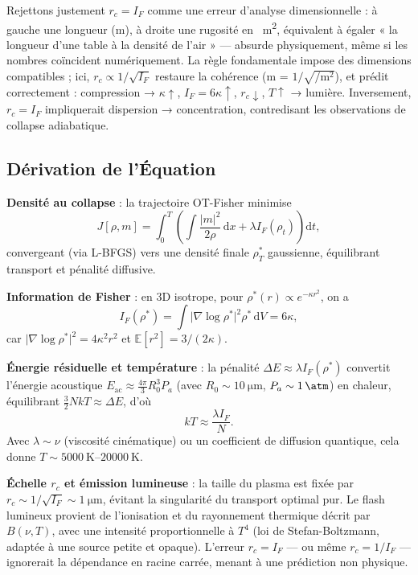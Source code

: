 \documentclass[a4paper,12pt]{article}
\begin{document}
Rejettons justement \( r_c = I_F \) comme une erreur d'analyse dimensionnelle : à gauche une longueur (\si{\meter}), à droite une rugosité en \si{\per\meter\squared}, équivalent à égaler « la longueur d'une table à la densité de l'air » — absurde physiquement, même si les nombres coïncident numériquement. La règle fondamentale impose des dimensions compatibles ; ici, \( r_c \propto 1/\sqrt{I_F} \) restaure la cohérence (\si{\meter} = \( 1/\sqrt{\si{\per\meter\squared}} \)), et prédit correctement : compression → \( \kappa \uparrow \), \( I_F = 6 \kappa \uparrow \), \( r_c \downarrow \), \( T \uparrow \) → lumière. Inversement, \( r_c = I_F \) impliquerait dispersion → concentration, contredisant les observations de collapse adiabatique.

\subsection{Dérivation de l'Équation}

\item \textbf{Densité au collapse} : la trajectoire OT-Fisher minimise 
    \[
    J[\rho, m] = \int_0^T \left( \int \frac{\lvert m \rvert^2}{2 \rho} \, \mathrm{d}x + \lambda I_F(\rho_t) \right) \mathrm{d}t,
    \]
    convergeant (via L-BFGS) vers une densité finale \( \rho_T^* \) gaussienne, équilibrant transport et pénalité diffusive.
    
    \item \textbf{Information de Fisher} : en 3D isotrope, pour \( \rho^*(r) \propto e^{-\kappa r^2} \), on a
    \[
    I_F(\rho^*) = \int \lvert \nabla \log \rho^* \rvert^2 \rho^* \, \mathrm{d}V = 6 \kappa,
    \]
    car \( \lvert \nabla \log \rho^* \rvert^2 = 4 \kappa^2 r^2 \) et \( \mathbb{E}[r^2] = 3/(2\kappa) \).
    
    \item \textbf{Énergie résiduelle et température} : la pénalité \( \Delta E \approx \lambda I_F(\rho^*) \) convertit l'énergie acoustique \( E_{\text{ac}} \approx \frac{4\pi}{3} R_0^3 P_a \) (avec \( R_0 \sim \SI{10}{\micro\meter} \), \( P_a \sim \SI{1}{\atm} \)) en chaleur, équilibrant \( \frac{3}{2} N k T \approx \Delta E \), d'où
    \[
    k T \approx \frac{\lambda I_F}{N}.
    \]
    Avec \( \lambda \sim \nu \) (viscosité cinématique) ou un coefficient de diffusion quantique, cela donne \( T \sim \SIrange{5000}{20000}{\kelvin} \).
    
    \item \textbf{Échelle \( r_c \) et émission lumineuse} : la taille du plasma est fixée par \( r_c \sim 1/\sqrt{I_F} \sim \SI{1}{\micro\meter} \), évitant la singularité du transport optimal pur. Le flash lumineux provient de l’ionisation et du rayonnement thermique décrit par \( B(\nu, T) \), avec une intensité proportionnelle à \( T^4 \) (loi de Stefan-Boltzmann, adaptée à une source petite et opaque). L’erreur \( r_c = I_F \) — ou même \( r_c = 1/I_F \) — ignorerait la dépendance en racine carrée, menant à une prédiction non physique.
\end{document}
